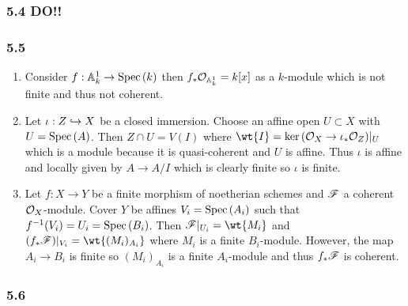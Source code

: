 \documentclass[12pt]{article}
\begin{document}
\subsubsection{5.4 DO!!}

\subsubsection{5.5}

\begin{enumerate}
\item Consider $f : \mathbb{A}^1_k \to \mathrm{Spec}\left( k \right)$ then $f_* \mathcal{O}_{\mathbb{A}^1_k} = k[x]$ as a $k$-module which is not finite and thus not coherent.
\item Let $\iota : Z \hookrightarrow X$ be a closed immersion. Choose an affine open $U \subset X$ with $U = \mathrm{Spec}\left( A \right)$. Then $Z \cap U = V(I)$ where $\wt{I} = \ker{(\struct{X} \to \iota_* \struct{Z})}|_U$ which is a module because it is quasi-coherent and $U$ is affine. Thus $\iota$ is affine and locally given by $A \to A/I$ which is clearly finite so $\iota$ is finite.
\item Let $f : X \to Y$ be a finite morphism of noetherian schemes and $\mathscr{F}$ a coherent $\mathcal{O}_{X}$-module. Cover $Y$ be affines $V_i = \mathrm{Spec}\left( A_i \right)$ such that $f^{-1}(V_i) = U_i = \mathrm{Spec}\left( B_i \right)$. Then $\F|_{U_i} = \wt{M_i}$ and $(f_* \F)|_{V_i} = \wt{(M_i)_{A_i}}$ where $M_i$ is a finite $B_i$-module. However, the map $A_i \to B_i$ is finite so $(M_i)_{A_i}$ is a finite $A_i$-module and thus $f_* \mathscr{F}$ is coherent.
\end{enumerate}

\subsubsection{5.6}
\end{document}

